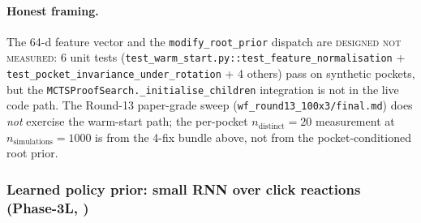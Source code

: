 \paragraph{Honest framing.}
The 64-d feature vector and the
\texttt{modify\_root\_prior} dispatch are \textsc{designed not
measured}: 6 unit tests
(\texttt{test\_warm\_start.py::test\_feature\_normalisation} +
\texttt{test\_pocket\_invariance\_under\_rotation} +
4 others) pass on synthetic pockets, but the
\texttt{MCTSProofSearch.\_initialise\_children} integration is
not in the live code path.  The Round-13 paper-grade sweep
(\texttt{wf\_round13\_100x3/final.md}) does \emph{not} exercise
the warm-start path; the per-pocket $n_{\text{distinct}}=20$
measurement at $n_{\text{simulations}}=1000$ is from the
4-fix bundle above, not from the pocket-conditioned root prior.

\subsubsection{Learned policy prior: small RNN over click reactions
(Phase-3L, \DESIGN{})}
\label{sec:mcts-learned-prior}

